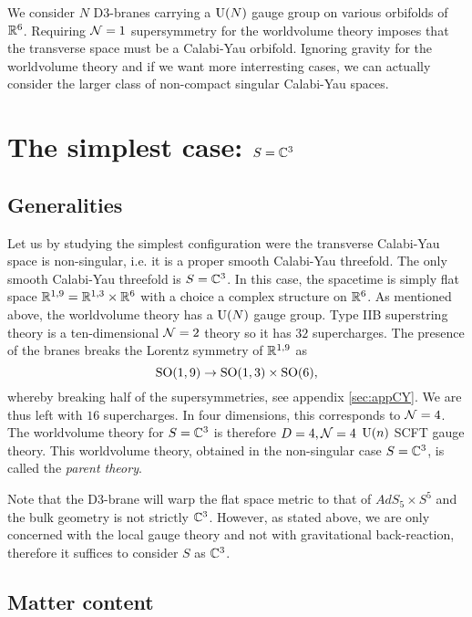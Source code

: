 \documentclass[a4paper,10pt]{article}
\begin{document}
    \begin{result}
        We consider $N$ D$3$-branes carrying a $\text{U}(N)$ gauge group on various orbifolds of $\mathbb{R}^6$. Requiring $\mathcal{N}=1$ supersymmetry for the worldvolume theory imposes that the transverse space must be a Calabi-Yau orbifold. Ignoring gravity for the worldvolume theory and if we want more interresting cases, we can actually consider the larger class of non-compact singular Calabi-Yau spaces.
    \end{result}
    

\section{The simplest case: $S=\mathbb{C}^3$}

    \subsection{Generalities}

        Let us by studying the simplest configuration were the transverse Calabi-Yau space is non-singular, i.e. it is a proper smooth Calabi-Yau threefold. The only smooth Calabi-Yau threefold is $S=\mathbb{C}^3$. In this case, the spacetime is simply flat space $\mathbb{R}^{1,9}=\mathbb{R}^{1,3}\times\mathbb{R}^6$ with a choice a complex structure on $\mathbb{R}^6$. As mentioned above, the worldvolume theory has a $\text{U}(N)$ gauge group. Type IIB superstring theory is a ten-dimensional $\mathcal{N}=2$ theory so it has $32$ supercharges. The presence of the branes breaks the Lorentz symmetry of $\mathbb{R}^{1,9}$ as
        \begin{equation}
            \text{SO}(1,9)\to\text{SO}(1,3)\times\text{SO}(6),
        \end{equation}
        whereby breaking half of the supersymmetries, see appendix \ref{sec:appCY}. We are thus left with $16$ supercharges. In four dimensions, this corresponds to $\mathcal{N}=4$. The worldvolume theory for $S=\mathbb{C}^3$ is therefore $D=4,\mathcal{N}=4$ $\text{U}(n)$ SCFT gauge theory. This worldvolume theory, obtained in the non-singular case $S=\mathbb{C}^3$, is called the \emph{parent theory}.

        Note that the D$3$-brane will warp the flat space metric to that of $AdS_5\times S^5$ and the bulk geometry is not strictly $\mathbb{C}^3$. However, as stated above, we are only concerned with the local gauge theory and not with gravitational back-reaction, therefore it suffices to consider $S$ as $\mathbb{C}^3$.

    \subsection{Matter content}
\end{document}
